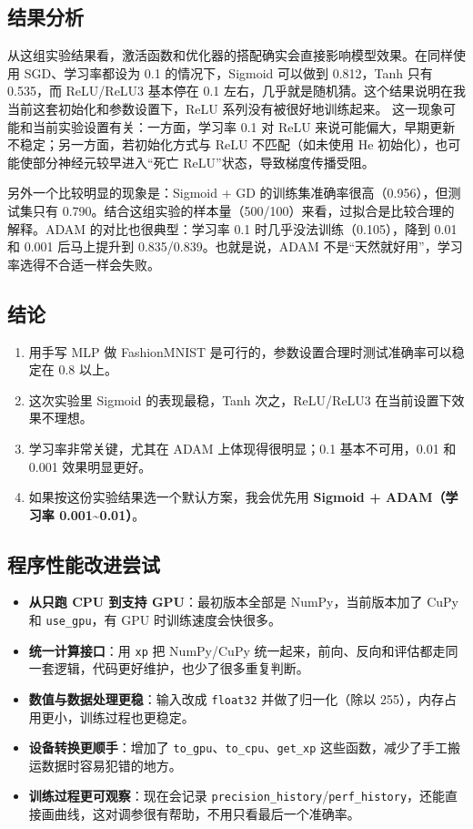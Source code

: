 \documentclass[a4paper,10pt,twocolumn]{article}
\begin{document}
\subsection{结果分析}

从这组实验结果看，激活函数和优化器的搭配确实会直接影响模型效果。在同样使用 SGD、学习率都设为 0.1 的情况下，Sigmoid 可以做到 0.812，Tanh 只有 0.535，而 ReLU/ReLU3 基本停在 0.1 左右，几乎就是随机猜。这个结果说明在我当前这套初始化和参数设置下，ReLU 系列没有被很好地训练起来。
这一现象可能和当前实验设置有关：一方面，学习率 0.1 对 ReLU 来说可能偏大，早期更新不稳定；另一方面，若初始化方式与 ReLU 不匹配（如未使用 He 初始化），也可能使部分神经元较早进入“死亡 ReLU”状态，导致梯度传播受阻。

另外一个比较明显的现象是：Sigmoid + GD 的训练集准确率很高（0.956），但测试集只有 0.790。结合这组实验的样本量（500/100）来看，过拟合是比较合理的解释。ADAM 的对比也很典型：学习率 0.1 时几乎没法训练（0.105），降到 0.01 和 0.001 后马上提升到 0.835/0.839。也就是说，ADAM 不是“天然就好用”，学习率选得不合适一样会失败。

\subsection{结论}

\begin{enumerate}
\item 用手写 MLP 做 FashionMNIST 是可行的，参数设置合理时测试准确率可以稳定在 0.8 以上。
\item 这次实验里 Sigmoid 的表现最稳，Tanh 次之，ReLU/ReLU3 在当前设置下效果不理想。
\item 学习率非常关键，尤其在 ADAM 上体现得很明显；0.1 基本不可用，0.01 和 0.001 效果明显更好。
\item 如果按这份实验结果选一个默认方案，我会优先用 \textbf{Sigmoid + ADAM（学习率 0.001\textasciitilde0.01）}。
\end{enumerate}

\subsection{程序性能改进尝试}

\begin{itemize}
\item \textbf{从只跑 CPU 到支持 GPU}：最初版本全部是 NumPy，当前版本加了 CuPy 和 \texttt{use\_gpu}，有 GPU 时训练速度会快很多。
\item \textbf{统一计算接口}：用 \texttt{xp} 把 NumPy/CuPy 统一起来，前向、反向和评估都走同一套逻辑，代码更好维护，也少了很多重复判断。
\item \textbf{数值与数据处理更稳}：输入改成 \texttt{float32} 并做了归一化（除以 255），内存占用更小，训练过程也更稳定。
\item \textbf{设备转换更顺手}：增加了 \texttt{to\_gpu}、\texttt{to\_cpu}、\texttt{get\_xp} 这些函数，减少了手工搬运数据时容易犯错的地方。
\item \textbf{训练过程更可观察}：现在会记录 \texttt{precision\_history}/\texttt{perf\_history}，还能直接画曲线，这对调参很有帮助，不用只看最后一个准确率。
\end{itemize}
\end{document}
